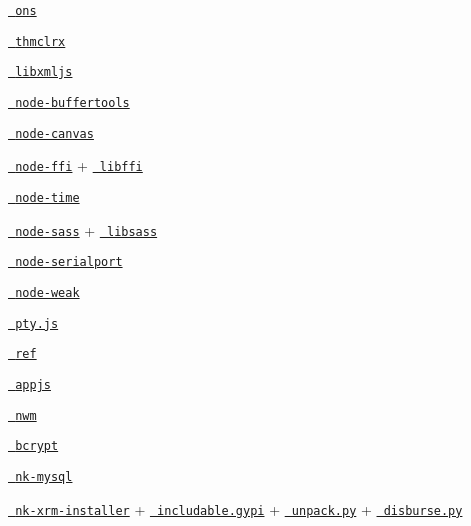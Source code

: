 \begin{DoxyItemize}
\item \href{https://github.com/XadillaX/aliyun-ons/blob/master/binding.gyp}{\texttt{ ons}}
\item \href{https://github.com/XadillaX/thmclrx/blob/master/binding.gyp}{\texttt{ thmclrx}}
\item \href{https://github.com/polotek/libxmljs/blob/master/binding.gyp}{\texttt{ libxmljs}}
\item \href{https://github.com/bnoordhuis/node-buffertools/blob/master/binding.gyp}{\texttt{ node-\/buffertools}}
\item \href{https://github.com/LearnBoost/node-canvas/blob/master/binding.gyp}{\texttt{ node-\/canvas}}
\item \href{https://github.com/rbranson/node-ffi/blob/master/binding.gyp}{\texttt{ node-\/ffi}} + \href{https://github.com/rbranson/node-ffi/blob/master/deps/libffi/libffi.gyp}{\texttt{ libffi}}
\item \href{https://github.com/TooTallNate/node-time/blob/master/binding.gyp}{\texttt{ node-\/time}}
\item \href{https://github.com/sass/node-sass/blob/master/binding.gyp}{\texttt{ node-\/sass}} + \href{https://github.com/sass/node-sass/blob/master/src/libsass.gyp}{\texttt{ libsass}}
\item \href{https://github.com/voodootikigod/node-serialport/blob/master/binding.gyp}{\texttt{ node-\/serialport}}
\item \href{https://github.com/TooTallNate/node-weak/blob/master/binding.gyp}{\texttt{ node-\/weak}}
\item \href{https://github.com/chjj/pty.js/blob/master/binding.gyp}{\texttt{ pty.\+js}}
\item \href{https://github.com/TooTallNate/ref/blob/master/binding.gyp}{\texttt{ ref}}
\item \href{https://github.com/milani/appjs/blob/master/binding.gyp}{\texttt{ appjs}}
\item \href{https://github.com/mixu/nwm/blob/master/binding.gyp}{\texttt{ nwm}}
\item \href{https://github.com/ncb000gt/node.bcrypt.js/blob/master/binding.gyp}{\texttt{ bcrypt}}
\item \href{https://github.com/mmod/nodamysql/blob/master/binding.gyp}{\texttt{ nk-\/mysql}}
\item \href{https://github.com/mmod/nk-xrm-installer/blob/master/binding.gyp}{\texttt{ nk-\/xrm-\/installer}} + \href{https://github.com/mmod/nk-xrm-installer/blob/master/includable.gypi}{\texttt{ includable.\+gypi}} + \href{https://github.com/mmod/nk-xrm-installer/blob/master/unpack.py}{\texttt{ unpack.\+py}} + \href{https://github.com/mmod/nk-xrm-installer/blob/master/disburse.py}{\texttt{ disburse.\+py}} ~\newline

\end{DoxyItemize}

